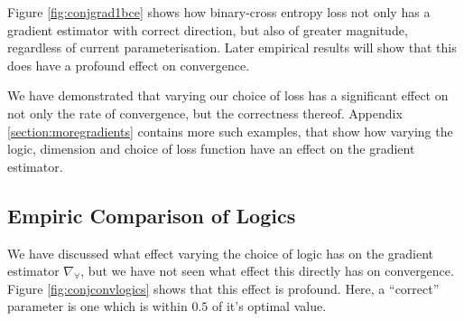 Figure \ref{fig:conjgrad1bce} shows how binary-cross entropy loss not only has a gradient estimator with correct direction, but also of greater magnitude, regardless of current parameterisation. Later empirical results will show that this does have a profound effect on convergence.

We have demonstrated that varying our choice of loss has a significant effect on not only the rate of convergence, but the correctness thereof. Appendix \ref{section:moregradients} contains more such examples, that show how varying the logic, dimension and choice of loss function have an effect on the gradient estimator.

\subsection{Empiric Comparison of Logics}

We have discussed what effect varying the choice of logic has on the gradient estimator $\nabla_\forall$, but we have not seen what effect this directly has on convergence. Figure \ref{fig:conjconvlogics} shows that this effect is profound. Here, a ``correct'' parameter is one which is within $0.5$ of it's optimal value.

